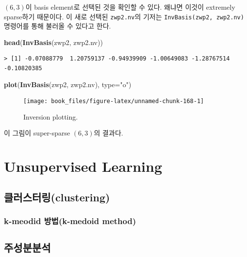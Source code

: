 \documentclass[b5paper,]{book}
\makeatletter
\newenvironment{Shaded}{\begin{snugshade}}{\end{snugshade}}
\newcommand{\KeywordTok}[1]{\textcolor[rgb]{0.13,0.29,0.53}{\textbf{{#1}}}}
\newcommand{\DataTypeTok}[1]{\textcolor[rgb]{0.13,0.29,0.53}{{#1}}}
\newcommand{\StringTok}[1]{\textcolor[rgb]{0.31,0.60,0.02}{{#1}}}
\newcommand{\NormalTok}[1]{{#1}}
\newenvironment{kframe}{%
\medskip{}
\setlength{\fboxsep}{.8em}
 \def\at@end@of@kframe{}%
 \ifinner\ifhmode%
  \def\at@end@of@kframe{\end{minipage}}%
  \begin{minipage}{\columnwidth}%
 \fi\fi%
 \def\FrameCommand##1{\hskip\@totalleftmargin \hskip-\fboxsep
 \colorbox{shadecolor}{##1}\hskip-\fboxsep
     \hskip-\linewidth \hskip-\@totalleftmargin \hskip\columnwidth}%
 \MakeFramed {\advance\hsize-\width
   \@totalleftmargin\z@ \linewidth\hsize
   \@setminipage}}%
 {\par\unskip\endMakeFramed%
 \at@end@of@kframe}
\renewenvironment{Shaded}{\begin{kframe}}{\end{kframe}}
\theoremstyle{definition}
\theoremstyle{definition}
\theoremstyle{definition}
\theoremstyle{remark}
\makeatother
\begin{document}
\((6,3)\)이 basis element로 선택된 것을 확인할 수 있다. 왜냐면 이것이
extremely sparse하기 때문이다. 이 새로 선택된 \texttt{zwp2.nv}의 기저는
\texttt{InvBasis(zwp2,\ zwp2.nv)} 명령어를 통해 불러올 수 있다고 한다.

\begin{Shaded}
\begin{Highlighting}[]
\KeywordTok{head}\NormalTok{(}\KeywordTok{InvBasis}\NormalTok{(zwp2, zwp2.nv))}
\end{Highlighting}
\end{Shaded}

\begin{verbatim}
> [1] -0.07088779  1.20759137 -0.94939909 -1.00649083 -1.28767514 -0.10820385
\end{verbatim}

\begin{Shaded}
\begin{Highlighting}[]
\KeywordTok{plot}\NormalTok{(}\KeywordTok{InvBasis}\NormalTok{(zwp2, zwp2.nv), }\DataTypeTok{type=}\StringTok{"o"}\NormalTok{)}
\end{Highlighting}
\end{Shaded}

\begin{figure}

{\centering \texttt{[image: book\_files/figure-latex/unnamed-chunk-168-1]} 

}

\caption{Inversion plotting.}\label{fig:unnamed-chunk-168}
\end{figure}

이 그림이 super-sparse \((6,3)\)의 결과다.

\part{Unsupervised
Learning}\label{part-unsupervised-learning}

\chapter{클러스터링(clustering)}\label{clustering}

\section{k-meodid 방법(k-medoid method)}\label{k-meodid-k-medoid-method}

\chapter{주성분분석}\label{PCA}
\end{document}
